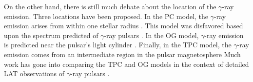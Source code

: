 On the other hand, there is still much debate about the location
of the $\gamma$-ray emission.  Three locations have been proposed.
In the \ac{PC} model, the $\gamma$-ray emission arises from within one
stellar radius \citep{daugherty_1996a_gamma-ray-pulsars:}.  This model
was disfavored based upon the spectrum predicted of $\gamma$-ray
pulsars \citep{abdo_2009b_fermi-large}.  In the \ac{OG} model,
$\gamma$-ray emission is predicted near the pulsar's light cylinder
\citep{cheng_1986a_energetic-radiation,romani_1996a_gamma-ray-pulsars:}.
Finally, in the \ac{TPC} model, the $\gamma$-ray emission
comes from an intermediate region in the pulsar magnetosphere
\citep{dyks_2003a_two-pole-caustic,muslimov_2004a_high-altitude-particle}
Much work has gone into comparing the \ac{TPC} and
\ac{OG} models in the context of detailed \ac{LAT}
observations of $\gamma$-ray pulsars \citep[See for
example][]{watters_2011a_galactic-population,romani_2011a_sub-luminous-gamma-ray}.

